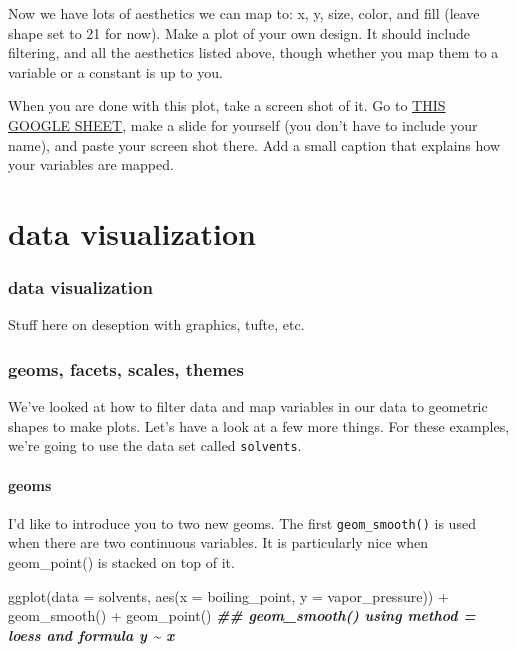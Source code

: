 \documentclass[
]{krantz}
\newenvironment{Shaded}{\begin{snugshade}}{\end{snugshade}}
\newcommand{\AttributeTok}[1]{\textcolor[rgb]{0.77,0.63,0.00}{#1}}
\newcommand{\DocumentationTok}[1]{\textcolor[rgb]{0.56,0.35,0.01}{\textbf{\textit{#1}}}}
\newcommand{\FunctionTok}[1]{\textcolor[rgb]{0.00,0.00,0.00}{#1}}
\newcommand{\NormalTok}[1]{#1}
\newcommand{\SpecialCharTok}[1]{\textcolor[rgb]{0.00,0.00,0.00}{#1}}
\begin{document}
Now we have lots of aesthetics we can map to: x, y, size, color, and fill (leave shape set to 21 for now). Make a plot of your own design. It should include filtering, and all the aesthetics listed above, though whether you map them to a variable or a constant is up to you.

When you are done with this plot, take a screen shot of it. Go to \href{https://docs.google.com/presentation/d/1G0BJ_qye9a_HAPLktFytj66qSj20BjoUOTKtjmCyuN0/edit?usp=sharing}{THIS GOOGLE SHEET}, make a slide for yourself (you don't have to include your name), and paste your screen shot there. Add a small caption that explains how your variables are mapped.

\hypertarget{part-data-visualization}{%
\part{data visualization}\label{part-data-visualization}}

\hypertarget{data-visualization-1}{%
\section*{data visualization}\label{data-visualization-1}}

Stuff here on deseption with graphics, tufte, etc.

\hypertarget{geoms_facets_scales_themes}{%
\section{geoms, facets, scales, themes}\label{geoms_facets_scales_themes}}

We've looked at how to filter data and map variables in our data to geometric shapes to make plots. Let's have a look at a few more things. For these examples, we're going to use the data set called \texttt{solvents}.

\hypertarget{geoms}{%
\subsection{geoms}\label{geoms}}

I'd like to introduce you to two new geoms. The first \texttt{geom\_smooth()} is used when there are two continuous variables. It is particularly nice when geom\_point() is stacked on top of it.

\begin{Shaded}
\begin{Highlighting}[]
\FunctionTok{ggplot}\NormalTok{(}\AttributeTok{data =}\NormalTok{ solvents, }\FunctionTok{aes}\NormalTok{(}\AttributeTok{x =}\NormalTok{ boiling\_point, }\AttributeTok{y =}\NormalTok{ vapor\_pressure)) }\SpecialCharTok{+} 
  \FunctionTok{geom\_smooth}\NormalTok{() }\SpecialCharTok{+}
  \FunctionTok{geom\_point}\NormalTok{()}
\DocumentationTok{\#\# \textasciigrave{}geom\_smooth()\textasciigrave{} using method = \textquotesingle{}loess\textquotesingle{} and formula \textquotesingle{}y \textasciitilde{} x\textquotesingle{}}
\end{Highlighting}
\end{Shaded}
\end{document}
